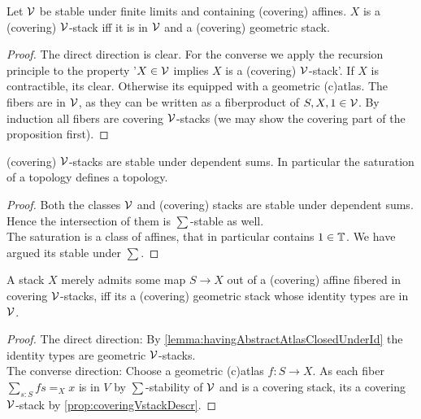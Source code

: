 \begin{prop}{\label{prop:coveringVstackDescr}}
	Let $\mathcal{V}$ be stable under finite limits and containing (covering) affines. $X$ is a (covering) $\mathcal{V}$-stack iff it is in $\mathcal{V}$ and a (covering) geometric stack.
\end{prop}
\begin{proof} 	
	The direct direction is clear. For the converse we apply the recursion principle to the property '$X \in \mathcal{V}$ implies $X$ is a (covering) $\mathcal{V}$-stack'. If $X$ is contractible, its clear. Otherwise its equipped with a geometric (c)atlas. The fibers are in $\mathcal{V}$, as they can be written as a fiberproduct of $S, X, 1 \in \mathcal{V}$.  By induction all fibers are covering $\mathcal{V}$-stacks (we may show the covering part of the proposition first). %
\end{proof}
\begin{prop}{\label{prop:CSVSum}}
	(covering) $\mathcal{V}$-stacks are stable under dependent sums. In particular the saturation of a topology defines a topology.
\end{prop}
\begin{proof}
	Both the classes $\mathcal{V}$ and (covering) stacks are stable under dependent sums. Hence the intersection of them is $\sum$-stable as well. \\
	The saturation is a class of affines, that in particular contains $1 \in \mathbb{T}$. We have argued its stable under $\sum$.
\end{proof}
\begin{prop}{\label{prop:V'stacks}}
	A stack $X$ merely admits some map $S \to X$ out of a (covering) affine fibered in covering $\mathcal{V}$-stacks, iff its a (covering) geometric stack whose identity types are in $\mathcal{V}$. 
\end{prop}
\begin{proof}
	The direct direction: By \ref{lemma:havingAbstractAtlasClosedUnderId} the identity types are geometric $\mathcal{V}$-stacks. \\
	The converse direction: Choose a geometric (c)atlas $f : S \to X$. As each fiber $\sum_{s : S} f s =_X x$ is in $V$ by $\sum$-stability of $\mathcal{V}$ and is a covering stack, its a covering $\mathcal{V}$-stack by \ref{prop:coveringVstackDescr}.
\end{proof}

